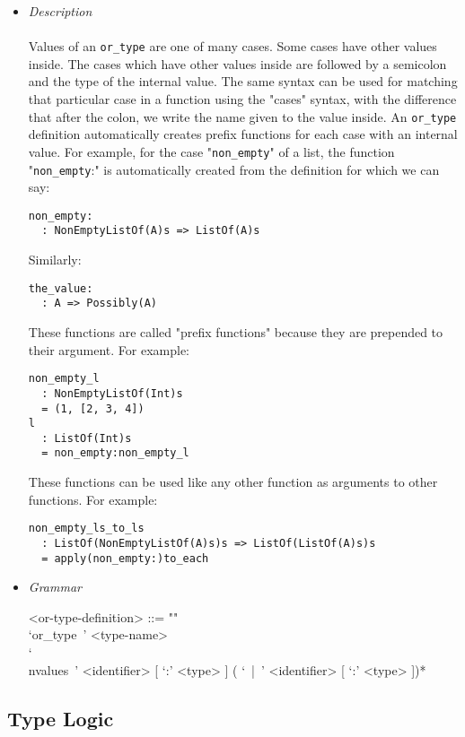 \documentclass{article}
\begin{document}
\begin{itemize}
\item \textit{Description} \\\\
Values of an \texttt{or_type} are one of many cases. Some cases have other
values inside.  The cases which have other values inside are followed by a
semicolon and the type of the internal value. The same syntax can be used for
matching that particular case in a function using the "cases" syntax, with the
difference that after the colon, we write the name given to the value inside.
An \texttt{or_type} definition automatically creates prefix functions for each
case with an internal value.  For example, for the case "\texttt{non_empty}" of
a list, the function "\texttt{non_empty}:" is automatically created from the
definition for which we can say:
\begin{verbatim}
non_empty:
  : NonEmptyListOf(A)s => ListOf(A)s
\end{verbatim}
Similarly:
\begin{verbatim}
the_value:
  : A => Possibly(A)
\end{verbatim}
These functions are called "prefix functions" because they are prepended to their
argument.
For example:
\begin{verbatim}
non_empty_l
  : NonEmptyListOf(Int)s
  = (1, [2, 3, 4])
l
  : ListOf(Int)s
  = non_empty:non_empty_l
\end{verbatim}
These functions can be used like any other function as arguments to other functions.
For example:
\begin{verbatim}
non_empty_ls_to_ls
  : ListOf(NonEmptyListOf(A)s)s => ListOf(ListOf(A)s)s
  = apply(non_empty:)to_each
\end{verbatim}

\item \textit{Grammar}

\begin{grammar}
<or-type-definition> ::= ""\\
`or_type\ ' <type-name> 
\\`\\nvalues\ ' <identifier> [ `:' <type> ] ( `\ |\ ' <identifier> [ `:' <type> ])*
\end{grammar}

\end{itemize}

\subsection{Type Logic}
\label{subsec:typelogic}
\end{document}
